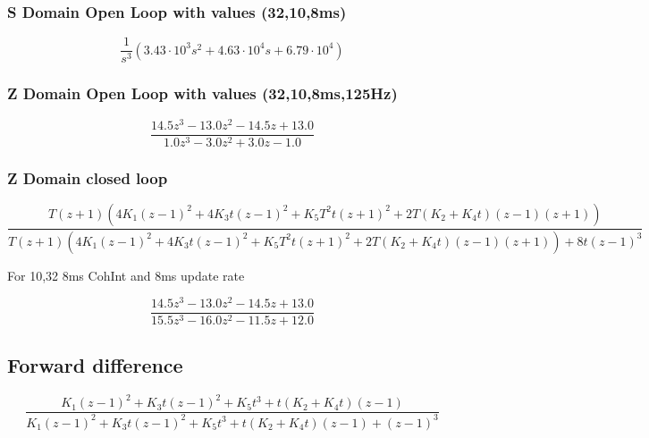 \subsubsection{S Domain Open Loop with values (32,10,8ms)}
\begin{equation}
\frac{1}{s^{3}} \left(3.43 \cdot 10^{3} s^{2} + 4.63 \cdot 10^{4} s + 6.79 \cdot 10^{4}\right)
\end{equation}


\subsubsection{Z Domain Open Loop with values (32,10,8ms,125Hz)}
\begin{equation}
\frac{14.5 z^{3} - 13.0 z^{2} - 14.5 z + 13.0}{1.0 z^{3} - 3.0 z^{2} + 3.0 z - 1.0}
\end{equation}





\subsubsection{Z Domain closed loop}
\begin{equation}
\frac{T \left(z + 1\right) \left(4 K_{1} \left(z - 1\right)^{2} + 4 K_{3} t \left(z - 1\right)^{2} + K_{5} T^{2} t \left(z + 1\right)^{2} + 2 T \left(K_{2} + K_{4} t\right) \left(z - 1\right) \left(z + 1\right)\right)}{T \left(z + 1\right) \left(4 K_{1} \left(z - 1\right)^{2} + 4 K_{3} t \left(z - 1\right)^{2} + K_{5} T^{2} t \left(z + 1\right)^{2} + 2 T \left(K_{2} + K_{4} t\right) \left(z - 1\right) \left(z + 1\right)\right) + 8 t \left(z - 1\right)^{3}}
\end{equation}




For 10,32 8ms CohInt and 8ms update rate



\begin{equation}
\frac{14.5 z^{3} - 13.0 z^{2} - 14.5 z + 13.0}{15.5 z^{3} - 16.0 z^{2} - 11.5 z + 12.0}\end{equation}
\clearpage

\subsection{Forward difference}

\begin{equation}
\frac{K_{1} \left(z - 1\right)^{2} + K_{3} t \left(z - 1\right)^{2} + K_{5} t^{3} + t \left(K_{2} + K_{4} t\right) \left(z - 1\right)}{K_{1} \left(z - 1\right)^{2} + K_{3} t \left(z - 1\right)^{2} + K_{5} t^{3} + t \left(K_{2} + K_{4} t\right) \left(z - 1\right) + \left(z - 1\right)^{3}}
\end{equation}


